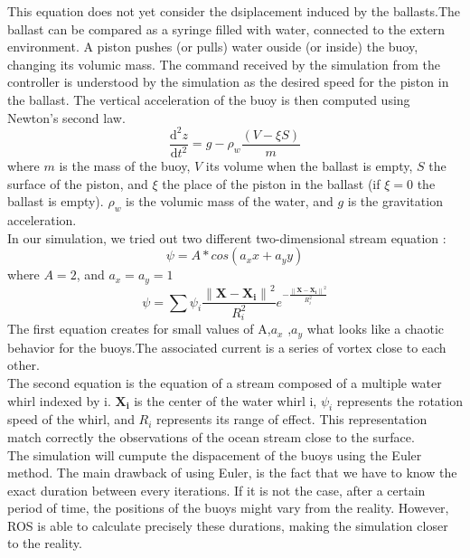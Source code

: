 \documentclass[a4paper]{report}
\begin{document}
This equation does not yet consider the dsiplacement induced by the ballasts.The ballast can be compared as a syringe filled with water, connected to the extern environment. A piston pushes (or pulls) water ouside (or inside) the buoy, changing its volumic mass.
The command received by the simulation from the controller is understood by the simulation as the desired speed for the piston in the ballast.
The vertical acceleration of the buoy is then computed using Newton's second law.\\
\begin{equation}
\frac{\mathrm{d^2} z}{\mathrm{d} t^2}= g-\rho_w \frac {\left ( V-\xi S \right )}{m}
\end{equation}
where $m$ is the mass of the buoy, $V$ its volume when the ballast is empty, $S$ the surface of the piston, and $\xi$ the place of the piston in the ballast (if $\xi = 0$ the ballast is empty). $\rho_w$ is the volumic mass of the water, and $g$ is the gravitation acceleration.\\


In our simulation, we tried out two different two-dimensional stream equation :
\begin{equation}
\psi = A*cos(a_x x+a_y y)
\end{equation}
where $A=2$, and $a_x = a_y = 1$
\begin{equation}
\psi = \sum \psi _i \frac{\left \| \mathbf{X}-\mathbf{X_i} \right \|^2 }{R_i ^2}e^{ -\frac{\left \| \mathbf{X}-\mathbf{X_i} \right \|^2 }{R_i ^2}}
\end{equation}
The first equation creates for small values of A,$a_x$ ,$a_y$ what looks like a chaotic behavior for the buoys.The associated current is a series of vortex close to each other.\\

The second equation is the equation of a stream composed of a multiple water whirl indexed by i. $\mathbf{X_i}$ is the center of the water whirl i, $\psi _i$ represents the rotation speed of the whirl, and $R_i$ represents its range of effect. This representation match correctly the observations of the ocean stream close to the surface. \\

The simulation will cumpute the dispacement of the buoys using the Euler method. The main drawback of using Euler, is the fact that we have to know the exact duration between every iterations. If it is not the case, after a certain period of time, the positions of the buoys might vary from the reality. However, ROS is able to calculate precisely these durations, making the simulation closer to the reality. 
\end{document}
